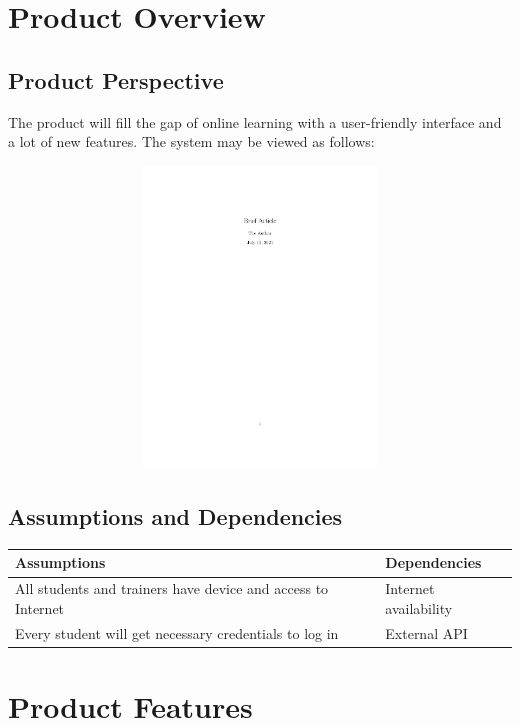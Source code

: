 \documentclass[a4paper]{article}
\begin{document}
\bigskip
\section{Product Overview}
\subsection{Product Perspective}
The product will fill the gap of online learning with a user-friendly interface and a lot of new features. The system may be viewed as follows: \\
\begin{figure}[h]
\includegraphics[width=12cm, height=8cm] {a1}
\centering
\end{figure}
\bigskip

\subsection{Assumptions and Dependencies}

\begin{table}[H]
\centering
\begin{tabular}{|p{5cm}|p{5cm}|}
\hline
\rowcolor{gray}
Assumptions & Dependencies\\ \hline
All students and trainers have device and access to Internet & Internet availability\\ \hline
Every student will get necessary credentials to log in & External API \\
\hline
\end{tabular}
\end{table}


\bigskip
\section{Product Features}
\end{document}
